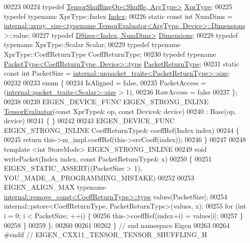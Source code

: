 \begin{DoxyCode}
00223 
00224   \textcolor{keyword}{typedef} \hyperlink{class_eigen_1_1_tensor_shuffling_op}{TensorShufflingOp<Shuffle, ArgType>} 
      \hyperlink{class_eigen_1_1_tensor_shuffling_op}{XprType};
00225   \textcolor{keyword}{typedef} \textcolor{keyword}{typename} XprType::Index \hyperlink{namespace_eigen_a62e77e0933482dafde8fe197d9a2cfde}{Index};
00226   \textcolor{keyword}{static} \textcolor{keyword}{const} \textcolor{keywordtype}{int} NumDims = 
      \hyperlink{struct_eigen_1_1internal_1_1array__size}{internal::array\_size<typename TensorEvaluator<ArgType, Device>::Dimensions}
      >::value;
00227   \textcolor{keyword}{typedef} \hyperlink{struct_eigen_1_1_d_sizes}{DSizes<Index, NumDims>} \hyperlink{struct_eigen_1_1_d_sizes}{Dimensions};
00228   \textcolor{keyword}{typedef} \textcolor{keyword}{typename} XprType::Scalar Scalar;
00229   \textcolor{keyword}{typedef} \textcolor{keyword}{typename} XprType::CoeffReturnType CoeffReturnType;
00230   \textcolor{keyword}{typedef} \textcolor{keyword}{typename} \hyperlink{group___sparse_core___module}{PacketType<CoeffReturnType, Device>::type} 
      \hyperlink{group___sparse_core___module}{PacketReturnType};
00231   \textcolor{keyword}{static} \textcolor{keyword}{const} \textcolor{keywordtype}{int} PacketSize = 
      \hyperlink{struct_eigen_1_1internal_1_1unpacket__traits}{internal::unpacket\_traits<PacketReturnType>::size};
00232 
00233   \textcolor{keyword}{enum} \{
00234     IsAligned = \textcolor{keyword}{false},
00235     PacketAccess = (\hyperlink{struct_eigen_1_1internal_1_1packet__traits}{internal::packet\_traits<Scalar>::size} > 1),
00236     RawAccess = \textcolor{keyword}{false}
00237   \};
00238 
00239   EIGEN\_DEVICE\_FUNC EIGEN\_STRONG\_INLINE \hyperlink{struct_eigen_1_1_tensor_evaluator}{TensorEvaluator}(\textcolor{keyword}{const} XprType& op, \textcolor{keyword}{const} Device& 
      device)
00240       : Base(op, device)
00241   \{ \}
00242 
00243   EIGEN\_DEVICE\_FUNC EIGEN\_STRONG\_INLINE CoeffReturnType& coeffRef(Index index)
00244   \{
00245     \textcolor{keywordflow}{return} this->m\_impl.coeffRef(this->srcCoeff(index));
00246   \}
00247 
00248   \textcolor{keyword}{template} <\textcolor{keywordtype}{int} StoreMode> EIGEN\_STRONG\_INLINE
00249   \textcolor{keywordtype}{void} writePacket(Index index, \textcolor{keyword}{const} PacketReturnType& x)
00250   \{
00251     EIGEN\_STATIC\_ASSERT((PacketSize > 1), YOU\_MADE\_A\_PROGRAMMING\_MISTAKE)
00252 
00253     EIGEN\_ALIGN\_MAX \textcolor{keyword}{typename} \hyperlink{group___sparse_core___module}{internal::remove\_const<CoeffReturnType>::type}
       values[PacketSize];
00254     internal::pstore<CoeffReturnType, PacketReturnType>(values, x);
00255     \textcolor{keywordflow}{for} (\textcolor{keywordtype}{int} i = 0; i < PacketSize; ++i) \{
00256       this->coeffRef(index+i) = values[i];
00257     \}
00258   \}
00259 \};
00260 
00261 
00262 \} \textcolor{comment}{// end namespace Eigen}
00263 
00264 \textcolor{preprocessor}{#endif // EIGEN\_CXX11\_TENSOR\_TENSOR\_SHUFFLING\_H}
\end{DoxyCode}
